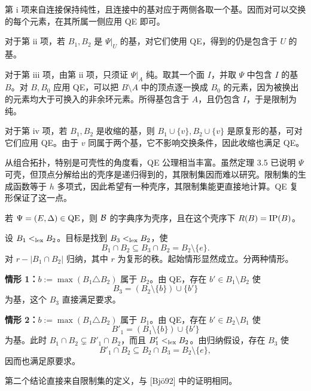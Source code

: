 \begin{proofcn}
第 i 项来自连接保持纯性，且连接中的基对应于两侧各取一个基。因而对可以交换的每个元素，在其所属一侧应用 QE 即可。

对于第 ii 项，若 $B_1,B_2$ 是 $\Psi|_U$ 的基，对它们使用 QE，得到的仍是包含于 $U$ 的基。

对于第 iii 项，由第 ii 项，只须证 $\Psi|_A$ 纯。取其一个面 $I$，并取 $\Psi$ 中包含 $I$ 的基 $B$。对 $B,B_0$ 应用 QE，可以把 $B\setminus A$ 中的顶点逐一换成 $B_0$ 的元素，因为被换出的元素均大于可换入的非余环元素。所得基包含于 $A$，且仍包含 $I$，于是限制为纯。

对于第 iv 项，若 $B_1,B_2$ 是收缩的基，则 $B_1\cup\{v\},B_2\cup\{v\}$ 是原复形的基，可对它们应用 QE。由于 $v$ 同属于两个基，它不影响交换条件，因此收缩也满足 QE。
\end{proofcn}

从组合拓扑，特别是可壳性的角度看，QE 公理相当丰富。虽然定理 3.5 已说明 $\Psi$ 可壳，但顶点分解给出的壳序是递归得到的，其限制集因而难以研究。限制集的生成函数等于 $h$ 多项式，因此希望有一种壳序，其限制集能更直接地计算。QE 复形保证了这一点。

若 $\Psi=(E,\Delta)\in\mathrm{QE}$，则 $\mathcal B$ 的字典序为壳序，且在这个壳序下 $R(B)=\operatorname{IP}(B)$。
\begin{proofcn}
设 $B_1<_{\mathrm{lex}}B_2$。目标是找到 $B_3<_{\mathrm{lex}}B_2$，使
\[
B_1\cap B_2\subseteq B_3\cap B_2=B_2\setminus\{e\}.
\]
对 $r-|B_1\cap B_2|$ 归纳，其中 $r$ 为复形的秩。起始情形显然成立。分两种情形。

\textbf{情形 1：}$b:=\max(B_1\triangle B_2)$ 属于 $B_2$。由 QE，存在 $b'\in B_1\setminus B_2$ 使
\[
B_3=(B_2\setminus\{b\})\cup\{b'\}
\]
为基，这个 $B_3$ 直接满足要求。

\textbf{情形 2：}$b:=\max(B_1\triangle B_2)$ 属于 $B_1$。由 QE，存在 $b'\in B_2\setminus B_1$ 使
\[
B'_1=(B_1\setminus\{b\})\cup\{b'\}
\]
为基。此时 $B_1\cap B_2\subsetneq B'_1\cap B_2$，而且 $B'_1<_{\mathrm{lex}}B_2$。由归纳假设，存在 $B_3$ 使
\[
B'_1\cap B_2\subseteq B_2\cap B_3=B_2\setminus\{e\},
\]
因而也满足原要求。

第二个结论直接来自限制集的定义，与 [Bjö92] 中的证明相同。
\end{proofcn}

